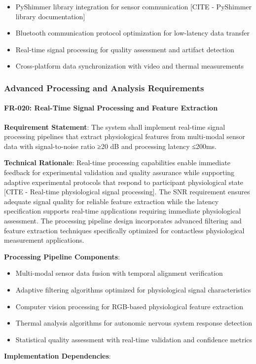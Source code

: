 \documentclass[11pt,a4paper]{report}
\begin{document}
\begin{itemize}
\item PyShimmer library integration for sensor communication [CITE - PyShimmer library documentation]
\item Bluetooth communication protocol optimization for low-latency data transfer
\item Real-time signal processing for quality assessment and artifact detection
\item Cross-platform data synchronization with video and thermal measurements

\end{itemize}
\subsubsection{Advanced Processing and Analysis Requirements}

\paragraph{FR-020: Real-Time Signal Processing and Feature Extraction}

\textbf{Requirement Statement}: The system shall implement real-time signal processing pipelines that extract physiological
features from multi-modal sensor data with signal-to-noise ratio ≥20 dB and processing latency ≤200ms.

\textbf{Technical Rationale}: Real-time processing capabilities enable immediate feedback for experimental validation and
quality assurance while supporting adaptive experimental protocols that respond to participant physiological
state [CITE - Real-time physiological signal processing]. The SNR requirement ensures adequate signal quality for
reliable feature extraction while the latency specification supports real-time applications requiring immediate
physiological assessment. The processing pipeline design incorporates advanced filtering and feature extraction
techniques specifically optimized for contactless physiological measurement applications.

\textbf{Processing Pipeline Components}:

\begin{itemize}
\item Multi-modal sensor data fusion with temporal alignment verification
\item Adaptive filtering algorithms optimized for physiological signal characteristics
\item Computer vision processing for RGB-based physiological feature extraction
\item Thermal analysis algorithms for autonomic nervous system response detection
\item Statistical quality assessment with real-time validation and confidence metrics

\end{itemize}
\textbf{Implementation Dependencies}:
\end{document}
